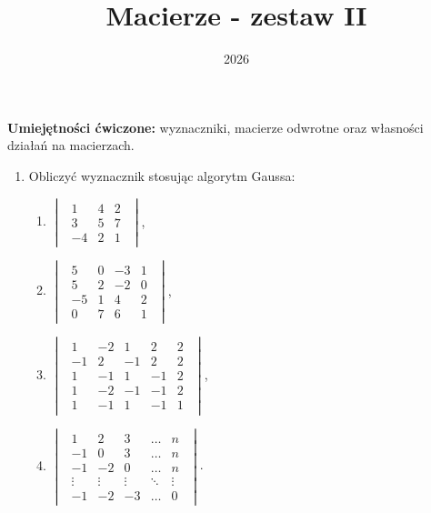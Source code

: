 \documentclass{article}
\title{Macierze - zestaw II}
\date{2026}
\begin{document}
\maketitle

\begin{center}
\textbf{Umiejętności ćwiczone:} wyznaczniki, macierze odwrotne oraz własności działań na macierzach.
\end{center}



\begin{enumerate}
    \item Obliczyć wyznacznik stosując algorytm Gaussa:
        \begin{enumerate}
            \item $\begin{vmatrix}\begin{array}{rrr} 1 & 4 & 2\\ 3 & 5 & 7\\ -4 & 2 & 1 \end{array}\end{vmatrix}$,
            \item $\begin{vmatrix}\begin{array}{rrrr} 5 & 0 & -3 & 1\\ 5 & 2 & -2 & 0\\ -5 & 1 & 4 & 2\\ 0 & 7 & 6 & 1 \end{array}\end{vmatrix}$,
            \item $\begin{vmatrix}\begin{array}{rrrrr} 1 & -2 & 1 & 2 & 2\\ -1 & 2 & -1 & 2 & 2\\ 1 & -1 & 1 & -1 & 2\\ 1 & -2 & -1 & -1 & 2\\ 1 & -1 & 1 & -1 & 1 \end{array} \end{vmatrix}$,
            \item $\begin{vmatrix}\begin{array}{rrrrr} 1 & 2 & 3 & \dots & n\\ -1 & 0 & 3 & \dots & n\\ -1 & -2 & 0 & \dots & n\\ \vdots & \vdots & \vdots & \ddots & \vdots\\ -1 & -2 & -3 & \dots & 0 \end{array} \end{vmatrix}$.
        \end{enumerate}


\end{enumerate}
\end{document}
